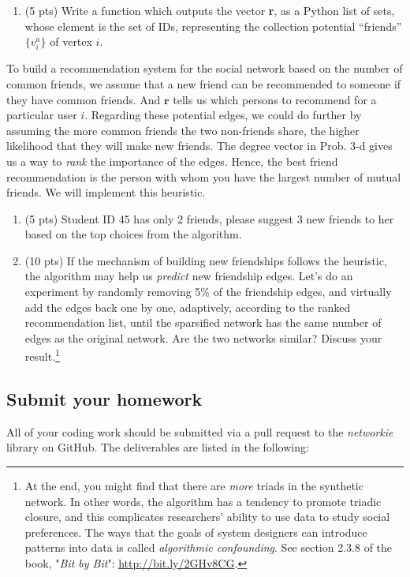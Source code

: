 \documentclass[10pt]{article}
\begin{document}
\begin{enumerate}
{{	\begin{enumerate}
		\item{(5 pts) Write a function which outputs the vector \textbf{r}, as a Python list of sets, whose element is the set of IDs, representing the collection potential ``friends'' $\lbrace v_i^a \rbrace$ of vertex $i$.}				
		
	\end{enumerate} 
	To build a recommendation system for the social network based on the number of common friends, we assume that a new friend can be recommended to someone if they have common friends. And $\textbf{r}$ tells us which persons to recommend for a particular user $i$. Regarding these potential edges, we could do further by assuming the more common friends the two non-friends share, the higher likelihood that they will make new friends. The degree vector in Prob. 3-d gives us a way to {\it rank} the importance of the edges. Hence, the best friend recommendation is the person with whom you have the largest number of mutual friends. We will implement this heuristic.
	\begin{enumerate}
		\item{(5 pts) Student ID 45 has only 2 friends, please suggest 3 new friends to her based on the top choices from the algorithm. }
		\item{(10 pts) If the mechanism of building new friendships follows the heuristic, the algorithm may help us {\it predict} new friendship edges. Let's do an experiment by randomly removing 5\% of the friendship edges, and virtually add the edges back one by one, adaptively, according to the ranked recommendation list, until the sparsified network has the same number of edges as the original network. Are the two networks similar? Discuss your result.\footnote[2]{At the end, you might find that there are {\it more} triads in the synthetic network. In other words, the algorithm has a tendency to promote triadic closure, and this complicates researchers' ability to use data to study social preferences. The ways that the goals of system designers can introduce patterns into data is called {\it algorithmic confounding}. See section 2.3.8 of the book, "{\it Bit by Bit}": \url{http://bit.ly/2GHv8CG}.}}
	\end{enumerate}
	
	}
	}
\end{enumerate}
\subsection*{Submit your homework}
All of your coding work should be submitted via a pull request to the {\it networkie} library on GitHub. The deliverables are listed in the following:
\end{document}
